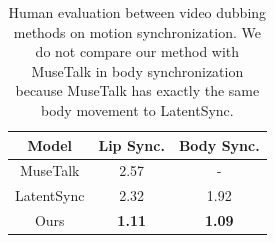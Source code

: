 
\begin{table}[t]
        \centering
        \begin{tabular}{c|cc}
        \toprule
            Model & Lip Sync. & Body Sync. 
            \\
            \midrule
            MuseTalk & 2.57 & - \\
            LatentSync & 2.32 & 1.92  \\
            Ours & \textbf{1.11} & \textbf{1.09} \\
            \bottomrule
        \end{tabular}
        \caption{
        Human evaluation between video dubbing methods on motion synchronization. We do not compare our method with MuseTalk in body synchronization because MuseTalk has exactly the same body movement to LatentSync.
        }
        \label{tab:human_evaluation}
\end{table}